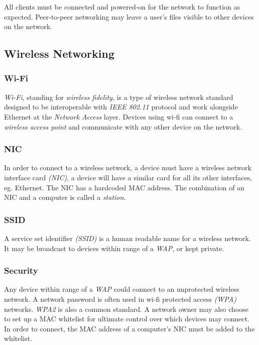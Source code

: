\documentclass[10pt]{article}
\begin{document}
All clients must be connected and powered-on for the network to function as expected. Peer-to-peer networking may leave a user's files visible to other devices on the network.

\subsection{Wireless Networking}
\label{sec:orga28d450}
\subsubsection{Wi-Fi}
\label{sec:orgdb64320}

\emph{Wi-Fi}, standing for \emph{wireless fidelity}, is a type of wireless network standard designed to be interoperable with \emph{IEEE 802.11} protocol and work alongside Ethernet at the \emph{Network Access} layer. Devices using wi-fi can connect to a \emph{wireless access point} and communicate with any other device on the network.

\subsubsection{NIC}
\label{sec:org7bb9ad0}

In order to connect to a wireless network, a device must have a wireless network interface card \emph{(NIC)}, a device will have a similar card for all its other interfaces, eg. Ethernet. The NIC has a hardcoded MAC address. The combination of an NIC and a computer is called a \emph{station}.

\subsubsection{SSID}
\label{sec:org4e9e0c0}

A service set identifier \emph{(SSID)} is a human readable name for a wireless network. It may be broadcast to devices within range of a \emph{WAP}, or kept private.

\subsubsection{Security}
\label{sec:orgfa9532e}

Any device within range of a \emph{WAP} could connect to an unprotected wireless network. A network password is often used in wi-fi protected access \emph{(WPA)} networks. \emph{WPA2} is also a common standard. A network owner may also choose to set up a MAC whitelist for ultimate control over which devices may connect. In order to connect, the MAC address of a computer's NIC must be added to the whitelist.
\end{document}
